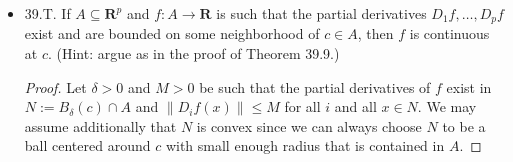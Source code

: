 \begin{itemize}
\begin{proof}
	Now we verify 
	\[
		D_u f(c)=D f(c)(u)=v_c \cdot u \quad \text{for all } u \in \boldsymbol{R}^p
	.\] 
	This can be shown using the Jacobian Matrix:
	\begin{equation*}
		Df(c)(u) = \left[ D_1 f (c) \quad \ldots \quad D_p f(c) \right] 
     \begin{bmatrix}
           u_{1} \\
           u_{2} \\
           \vdots \\
           u_{p}
         \end{bmatrix}
	 = \sum_{j=1}^{p} u_j D_j f(c)
	 = 
     \begin{bmatrix}
           D_1f(c) \\
           D_2f(c) \\
           \vdots \\
           D_pf(c)
         \end{bmatrix}
	 \cdot
     \begin{bmatrix}
           u_{1} \\
           u_{2} \\
           \vdots \\
           u_{p}
         \end{bmatrix}
\end{equation*} 
\end{proof}

(b) Use the Schwarz Inequality to show that if $u \in \boldsymbol{R}^p$ and $\|u\|=1$, then the function $u \mapsto D_u f(c)$ has a maximum value when $u$ is a positive multiple of $\nabla_c f$. Hence the direction in which the directional derivative of $f$ at $c$ is maximum is that of the gradient of $f$ at $c$.
\begin{proof}
	By Schwarz Inequality, $\|D_u f(c)\| =\| v_c \cdot u\| \le \|v_c\| \|u\|$ where equality holds iff  $v_c$ is scalar multiple of $u$. Hence maximum is attained when $u$ is positive multiple of $v_c = \Delta_c f$.
\end{proof}

\item 39.T. If $A \subseteq \boldsymbol{R}^p$ and $f: A \rightarrow \boldsymbol{R}$ is such that the partial derivatives $D_1 f, \ldots, D_p f$ exist and are bounded on some neighborhood of $c \in A$, then $f$ is continuous at $c$. (Hint: argue as in the proof of Theorem 39.9.)
\begin{proof}
	Let $\delta>0$ and $M > 0$ be such that the partial derivatives of $f$ exist in $N := B_\delta(c) \cap A$ and $\|D_i f(x)\|\le M$ for all $i$ and all $x \in N$. We may assume additionally that $N$ is convex since we can always choose $N$ to be a ball centered around $c$ with small enough radius that is contained in $A$.


\end{proof}
\end{itemize}
